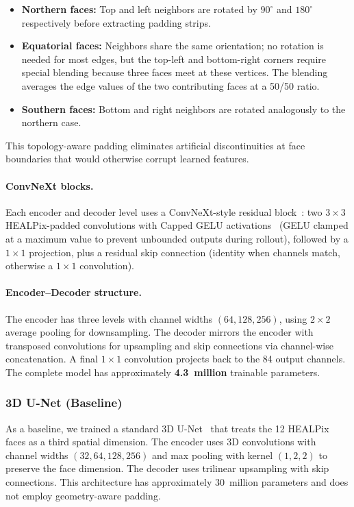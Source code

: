 \documentclass[11pt, a4paper, twocolumn]{article}
\begin{document}
\begin{itemize}
    \item \textbf{Northern faces:} Top and left neighbors are rotated by $90^\circ$ and $180^\circ$ respectively before extracting padding strips.
    \item \textbf{Equatorial faces:} Neighbors share the same orientation; no rotation is needed for most edges, but the top-left and bottom-right corners require special blending because three faces meet at these vertices. The blending averages the edge values of the two contributing faces at a 50/50 ratio.
    \item \textbf{Southern faces:} Bottom and right neighbors are rotated analogously to the northern case.
\end{itemize}

This topology-aware padding eliminates artificial discontinuities at face boundaries that would otherwise corrupt learned features.

\paragraph{ConvNeXt blocks.} Each encoder and decoder level uses a ConvNeXt-style residual block~\cite{liu2022convnext}: two $3 \times 3$ HEALPix-padded convolutions with Capped GELU activations~\cite{hendrycks2016} (GELU clamped at a maximum value to prevent unbounded outputs during rollout), followed by a $1 \times 1$ projection, plus a residual skip connection (identity when channels match, otherwise a $1 \times 1$ convolution).

\paragraph{Encoder--Decoder structure.} The encoder has three levels with channel widths $(64, 128, 256)$, using $2 \times 2$ average pooling for downsampling. The decoder mirrors the encoder with transposed convolutions for upsampling and skip connections via channel-wise concatenation. A final $1 \times 1$ convolution projects back to the 84 output channels. The complete model has approximately \textbf{4.3~million} trainable parameters.

\subsubsection{3D U-Net (Baseline)}

As a baseline, we trained a standard 3D U-Net~\cite{cicek20163d} that treats the 12 HEALPix faces as a third spatial dimension. The encoder uses 3D convolutions with channel widths $(32, 64, 128, 256)$ and max pooling with kernel $(1, 2, 2)$ to preserve the face dimension. The decoder uses trilinear upsampling with skip connections. This architecture has approximately 30~million parameters and does not employ geometry-aware padding.
\end{document}
